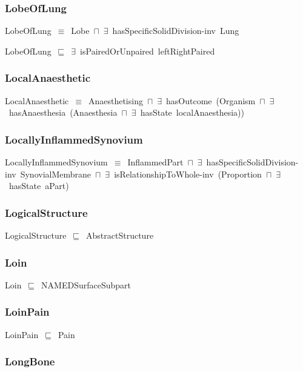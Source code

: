 \documentclass{article}
\begin{document}
\subsubsection*{LobeOfLung}

LobeOfLung~\ensuremath{\equiv}~Lobe~\ensuremath{\sqcap}~\ensuremath{\exists}~hasSpecificSolidDivision-inv~Lung

LobeOfLung~\ensuremath{\sqsubseteq}~\ensuremath{\exists}~isPairedOrUnpaired~leftRightPaired~

\subsubsection*{LocalAnaesthetic}

LocalAnaesthetic~\ensuremath{\equiv}~Anaesthetising~\ensuremath{\sqcap}~\ensuremath{\exists}~hasOutcome~(Organism~\ensuremath{\sqcap}~\ensuremath{\exists}~hasAnaesthesia~(Anaesthesia~\ensuremath{\sqcap}~\ensuremath{\exists}~hasState~localAnaesthesia))

\subsubsection*{LocallyInflammedSynovium}

LocallyInflammedSynovium~\ensuremath{\equiv}~InflammedPart~\ensuremath{\sqcap}~\ensuremath{\exists}~hasSpecificSolidDivision-inv~SynovialMembrane~\ensuremath{\sqcap}~\ensuremath{\exists}~isRelationshipToWhole-inv~(Proportion~\ensuremath{\sqcap}~\ensuremath{\exists}~hasState~aPart)

\subsubsection*{LogicalStructure}

LogicalStructure~\ensuremath{\sqsubseteq}~AbstractStructure~

\subsubsection*{Loin}

Loin~\ensuremath{\sqsubseteq}~NAMEDSurfaceSubpart~

\subsubsection*{LoinPain}

LoinPain~\ensuremath{\sqsubseteq}~Pain~

\subsubsection*{LongBone}
\end{document}
